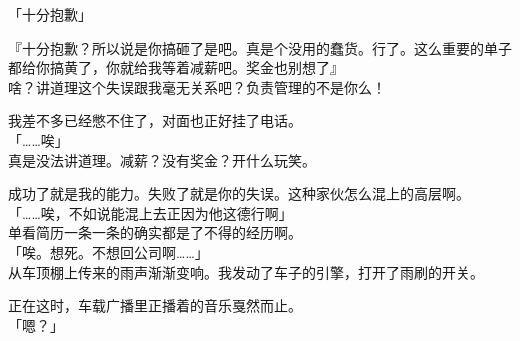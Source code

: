 「十分抱歉」

『十分抱歉？所以说是你搞砸了是吧。真是个没用的蠢货。行了。这么重要的单子都给你搞黄了，你就给我等着减薪吧。奖金也别想了』\\

啥？讲道理这个失误跟我毫无关系吧？负责管理的不是你么！

我差不多已经憋不住了，对面也正好挂了电话。\\

「……唉」\\

真是没法讲道理。减薪？没有奖金？开什么玩笑。

成功了就是我的能力。失败了就是你的失误。这种家伙怎么混上的高层啊。\\

「……唉，不如说能混上去正因为他这德行啊」\\

单看简历一条一条的确实都是了不得的经历啊。\\

「唉。想死。不想回公司啊……」\\

从车顶棚上传来的雨声渐渐变响。我发动了车子的引擎，打开了雨刷的开关。

正在这时，车载广播里正播着的音乐戛然而止。\\

「嗯？」\\

